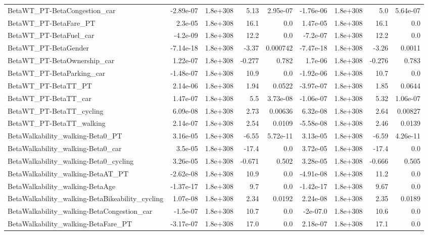 \begin{tabular}{lrrrrrrrr}
BetaWT_PT-BetaCongestion_car & -2.89e-07 & 1.8e+308 & 5.13 & 2.95e-07 & -1.76e-06 & 1.8e+308 & 5.0 & 5.64e-07 \\
BetaWT_PT-BetaFare_PT & 2.3e-05 & 1.8e+308 & 16.1 & 0.0 & 1.47e-05 & 1.8e+308 & 16.1 & 0.0 \\
BetaWT_PT-BetaFuel_car & -4.2e-09 & 1.8e+308 & 12.2 & 0.0 & -7.2e-07 & 1.8e+308 & 12.2 & 0.0 \\
BetaWT_PT-BetaGender & -7.14e-18 & 1.8e+308 & -3.37 & 0.000742 & -7.47e-18 & 1.8e+308 & -3.26 & 0.0011 \\
BetaWT_PT-BetaOwnership_car & 1.22e-07 & 1.8e+308 & -0.277 & 0.782 & 1.7e-06 & 1.8e+308 & -0.276 & 0.783 \\
BetaWT_PT-BetaParking_car & -1.48e-07 & 1.8e+308 & 10.9 & 0.0 & -1.92e-06 & 1.8e+308 & 10.7 & 0.0 \\
BetaWT_PT-BetaTT_PT & 2.14e-06 & 1.8e+308 & 1.94 & 0.0522 & -3.97e-07 & 1.8e+308 & 1.85 & 0.0644 \\
BetaWT_PT-BetaTT_car & 1.47e-07 & 1.8e+308 & 5.5 & 3.73e-08 & -1.06e-07 & 1.8e+308 & 5.32 & 1.06e-07 \\
BetaWT_PT-BetaTT_cycling & 6.09e-08 & 1.8e+308 & 2.73 & 0.00636 & 6.32e-08 & 1.8e+308 & 2.64 & 0.00827 \\
BetaWT_PT-BetaTT_walking & 2.14e-07 & 1.8e+308 & 2.54 & 0.0109 & -5.58e-08 & 1.8e+308 & 2.46 & 0.0139 \\
BetaWalkability_walking-Beta0_PT & 3.16e-05 & 1.8e+308 & -6.55 & 5.72e-11 & 3.13e-05 & 1.8e+308 & -6.59 & 4.26e-11 \\
BetaWalkability_walking-Beta0_car & 3.5e-05 & 1.8e+308 & -17.4 & 0.0 & 3.72e-05 & 1.8e+308 & -17.4 & 0.0 \\
BetaWalkability_walking-Beta0_cycling & 3.26e-05 & 1.8e+308 & -0.671 & 0.502 & 3.28e-05 & 1.8e+308 & -0.666 & 0.505 \\
BetaWalkability_walking-BetaAT_PT & -2.62e-08 & 1.8e+308 & 10.9 & 0.0 & -4.91e-08 & 1.8e+308 & 11.2 & 0.0 \\
BetaWalkability_walking-BetaAge & -1.37e-17 & 1.8e+308 & 9.7 & 0.0 & -1.42e-17 & 1.8e+308 & 9.67 & 0.0 \\
BetaWalkability_walking-BetaBikeability_cycling & 1.07e-08 & 1.8e+308 & 2.34 & 0.0192 & 2.24e-08 & 1.8e+308 & 2.35 & 0.0189 \\
BetaWalkability_walking-BetaCongestion_car & -1.5e-07 & 1.8e+308 & 10.7 & 0.0 & -2e-07.0 & 1.8e+308 & 10.6 & 0.0 \\
BetaWalkability_walking-BetaFare_PT & -3.17e-07 & 1.8e+308 & 17.0 & 0.0 & 2.18e-07 & 1.8e+308 & 17.1 & 0.0 \\

\end{tabular}
